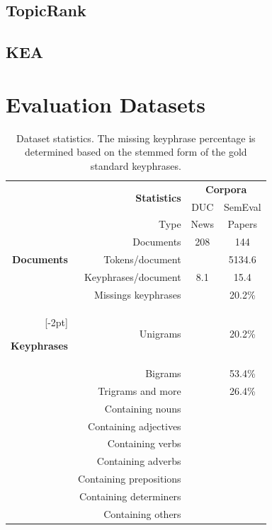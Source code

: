   \subsection{TopicRank}
  \label{subsec:topicrank}
  \subsection{KEA}
  \label{subsec:kea}

\section{Evaluation Datasets}
\label{sec:evaluation_datasets}

  \begin{table}[h]
    \centering
    \begin{tabular}{@{~}r@{~~}r@{~~}c@{~~}c@{~}}
      \toprule
      & \multirow{2}{*}[-2pt]{\textbf{Statistics}} & \multicolumn{2}{c}{\textbf{Corpora}}\\
      \cmidrule{3-4}
      & & DUC & SemEval\\
      \midrule
      \multirow{5}{*}[-2pt]{\begin{sideways}\textbf{Documents}\end{sideways}} & Type & News & Papers\\
      & Documents & 208 & 144\\
      & Tokens/document & & 5134.6\\
      & Keyphrases/document & 8.1 & 15.4\\
      & Missings keyphrases & & 20.2\%\\
      \addlinespace[\defaultaddspace]
      \multirow{10}{*}[-2pt]{\begin{sideways}\textbf{Keyphrases}\end{sideways}} & Unigrams & & 20.2\%\\
      & Bigrams & & 53.4\%\\
      & Trigrams and more & & 26.4\%\\
      & Containing nouns & & \\
      & Containing adjectives & & \\
      & Containing verbs & & \\
      & Containing adverbs & & \\
      & Containing prepositions & & \\
      & Containing determiners & & \\
      & Containing others & & \\
      \bottomrule
    \end{tabular}
    \caption{Dataset statistics. The missing keyphrase percentage is determined
             based on the stemmed form of the gold standard keyphrases.
             \label{tab:dataset_statistics}}
  \end{table}

